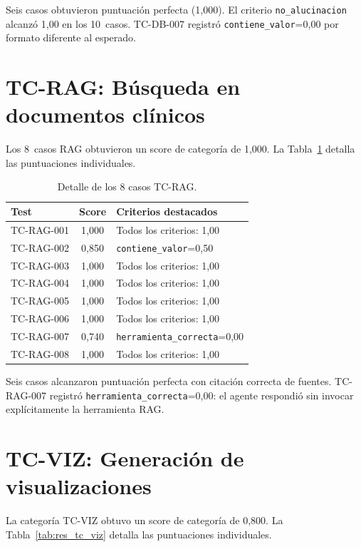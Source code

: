 Seis casos obtuvieron puntuación perfecta (1,000). El criterio \texttt{no\_alucinacion} alcanzó 1,00 en los 10~casos. TC-DB-007 registró \texttt{contiene\_valor}=0,00 por formato diferente al esperado.

\section{TC-RAG: Búsqueda en documentos clínicos}

Los 8~casos \ac{RAG} obtuvieron un score de categoría de 1,000. La Tabla~\ref{tab:res_tc_rag} detalla las puntuaciones individuales.

\begin{table}[H]
\centering
\caption{Detalle de los 8 casos TC-RAG.}
\label{tab:res_tc_rag}
\footnotesize
\begin{tabularx}{\columnwidth}{lcX}
\toprule
\textbf{Test} & \textbf{Score} & \textbf{Criterios destacados} \\
\midrule
TC-RAG-001 & 1,000 & Todos los criterios: 1,00 \\
TC-RAG-002 & 0,850 & \texttt{contiene\_valor}=0,50 \\
TC-RAG-003 & 1,000 & Todos los criterios: 1,00 \\
TC-RAG-004 & 1,000 & Todos los criterios: 1,00 \\
TC-RAG-005 & 1,000 & Todos los criterios: 1,00 \\
TC-RAG-006 & 1,000 & Todos los criterios: 1,00 \\
TC-RAG-007 & 0,740 & \texttt{herramienta\_correcta}=0,00 \\
TC-RAG-008 & 1,000 & Todos los criterios: 1,00 \\
\bottomrule
\end{tabularx}
\end{table}

Seis casos alcanzaron puntuación perfecta con citación correcta de fuentes. TC-RAG-007 registró \texttt{herramienta\_correcta}=0,00: el agente respondió sin invocar explícitamente la herramienta \ac{RAG}.

\section{TC-VIZ: Generación de visualizaciones}

La categoría TC-VIZ obtuvo un score de categoría de 0,800. La Tabla~\ref{tab:res_tc_viz} detalla las puntuaciones individuales.

